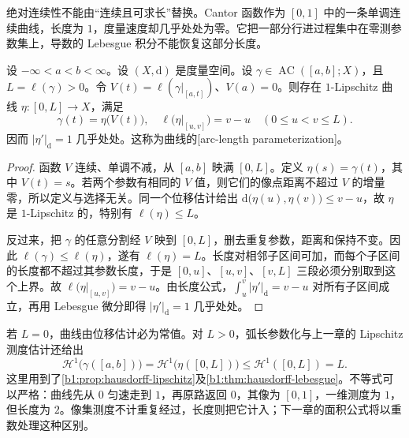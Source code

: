 绝对连续性不能由“连续且可求长”替换。Cantor 函数作为 \([0,1]\) 中的一条单调连续曲线，长度为 \(1\)，度量速度却几乎处处为零。它把一部分行进过程集中在零测参数集上，导数的 Lebesgue 积分不能恢复这部分长度。

\begin{proposition}
\label{b1:prop:arc-length-parameterization}
设 \(-\infty<a<b<\infty\)。设 \((X,\mathrm d)\) 是度量空间。设 \(\gamma\in\operatorname{AC}([a,b];X)\)，且 \(L=\ell(\gamma)>0\)。令 \(V(t)=\ell(\gamma|_{[a,t]})\)、\(V(a)=0\)。则存在 \(1\)-Lipschitz 曲线 \(\eta:[0,L]\to X\)，满足
\[
\gamma(t)=\eta\bigl(V(t)\bigr),
\quad
\ell\bigl(\eta|_{[u,v]}\bigr)=v-u
\quad(0\leq u<v\leq L).
\]
因而 \(|\eta'|_{\mathrm d}=1\) 几乎处处。这称为曲线的[arc-length parameterization]。
\end{proposition}
\begin{proof}
函数 \(V\) 连续、单调不减，从 \([a,b]\) 映满 \([0,L]\)。定义 \(\eta(s)=\gamma(t)\)，其中 \(V(t)=s\)。若两个参数有相同的 \(V\) 值，则它们的像点距离不超过 \(V\) 的增量零，所以定义与选择无关。同一个位移估计给出 \(\mathrm{d}\bigl(\eta(u),\eta(v)\bigr)\leq v-u\)，故 \(\eta\) 是 \(1\)-Lipschitz 的，特别有 \(\ell(\eta)\leq L\)。

反过来，把 \(\gamma\) 的任意分割经 \(V\) 映到 \([0,L]\)，删去重复参数，距离和保持不变。因此 \(\ell(\gamma)\leq\ell(\eta)\)，遂有 \(\ell(\eta)=L\)。长度对相邻子区间可加，而每个子区间的长度都不超过其参数长度，于是 \([0,u]\)、\([u,v]\)、\([v,L]\) 三段必须分别取到这个上界。故 \(\ell\bigl(\eta|_{[u,v]}\bigr)=v-u\)。由长度公式，\(\int_u^v|\eta'|_{\mathrm d}=v-u\) 对所有子区间成立，再用 Lebesgue 微分即得 \(|\eta'|_{\mathrm d}=1\) 几乎处处。
\end{proof}

若 \(L=0\)，曲线由位移估计必为常值。对 \(L>0\)，弧长参数化与上一章的 Lipschitz 测度估计还给出
\[
\mathcal H^1\bigl(\gamma([a,b])\bigr)
=\mathcal H^1\bigl(\eta([0,L])\bigr)
\leq\mathcal H^1([0,L])=L.
\]
这里用到了\cref{b1:prop:hausdorff-lipschitz}及\cref{b1:thm:hausdorff-lebesgue}。不等式可以严格：曲线先从 \(0\) 匀速走到 \(1\)，再原路返回 \(0\)，其像为 \([0,1]\)，一维测度为 \(1\)，但长度为 \(2\)。像集测度不计重复经过，长度则把它计入；下一章的面积公式将以重数处理这种区别。
